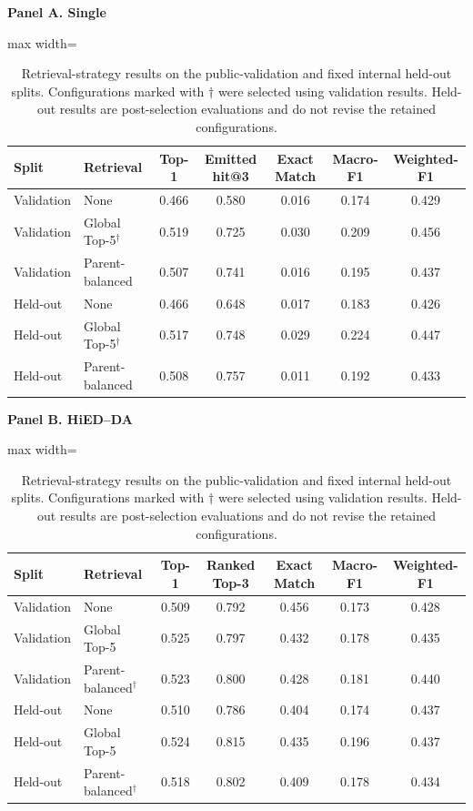 \begin{table}[H]
\centering
\caption{Retrieval-strategy results on the public-validation and fixed internal held-out splits. Configurations marked with $\dagger$ were selected using validation results. Held-out results are post-selection evaluations and do not revise the retained configurations.}
\label{tab:retrieval-results}
\small

\textbf{Panel A. Single}

\vspace{0.3em}

\begin{adjustbox}{max width=\textwidth}
\begin{tabular}{|l|l|c|c|c|c|c|}
\hline
Split & Retrieval & Top-1 & Emitted hit@3 & Exact Match & Macro-F1 & Weighted-F1\\
\hline
Validation & None & 0.466 & 0.580 & 0.016 & 0.174 & 0.429\\
Validation & Global Top-5$^{\dagger}$ & 0.519 & 0.725 & 0.030 & 0.209 & 0.456\\
Validation & Parent-balanced & 0.507 & 0.741 & 0.016 & 0.195 & 0.437\\
\hline
Held-out & None & 0.466 & 0.648 & 0.017 & 0.183 & 0.426\\
Held-out & Global Top-5$^{\dagger}$ & 0.517 & 0.748 & 0.029 & 0.224 & 0.447\\
Held-out & Parent-balanced & 0.508 & 0.757 & 0.011 & 0.192 & 0.433\\
\hline
\end{tabular}
\end{adjustbox}

\vspace{0.8em}

\textbf{Panel B. HiED--DA}

\vspace{0.3em}

\begin{adjustbox}{max width=\textwidth}
\begin{tabular}{|l|l|c|c|c|c|c|}
\hline
Split & Retrieval & Top-1 & Ranked Top-3 & Exact Match & Macro-F1 & Weighted-F1\\
\hline
Validation & None & 0.509 & 0.792 & 0.456 & 0.173 & 0.428\\
Validation & Global Top-5 & 0.525 & 0.797 & 0.432 & 0.178 & 0.435\\
Validation & Parent-balanced$^{\dagger}$ & 0.523 & 0.800 & 0.428 & 0.181 & 0.440\\
\hline
Held-out & None & 0.510 & 0.786 & 0.404 & 0.174 & 0.437\\
Held-out & Global Top-5 & 0.524 & 0.815 & 0.435 & 0.196 & 0.437\\
Held-out & Parent-balanced$^{\dagger}$ & 0.518 & 0.802 & 0.409 & 0.178 & 0.434\\
\hline
\end{tabular}
\end{adjustbox}


\end{table}
